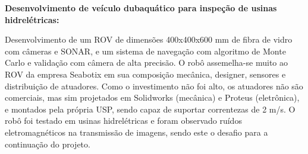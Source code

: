 
\textbf{Desenvolvimento de veículo dubaquático para inspeção de usinas
hidrelétricas:}

Desenvolvimento de um ROV de dimensões 400x400x600 mm de fibra de vidro com
câmeras e SONAR, e um sistema de navegação com algoritmo de Monte
Carlo e validação com câmera de alta precisão. O robô assemelha-se muito ao ROV
da empresa Seabotix em sua composição mecânica, designer, sensores e distribuição de atuadores. Como o investimento
não foi alto, os atuadores não são comerciais, mas sim projetados em Solidworks
(mecânica) e Proteus (eletrônica), e montados pela própria USP, sendo capaz de
suportar correntezas de 2 m/s. O robô foi testado em usinas
hidrelétricas e foram observado ruídos eletromagnéticos na transmissão de
imagens, sendo este o desafio para a continuação do projeto.\\
